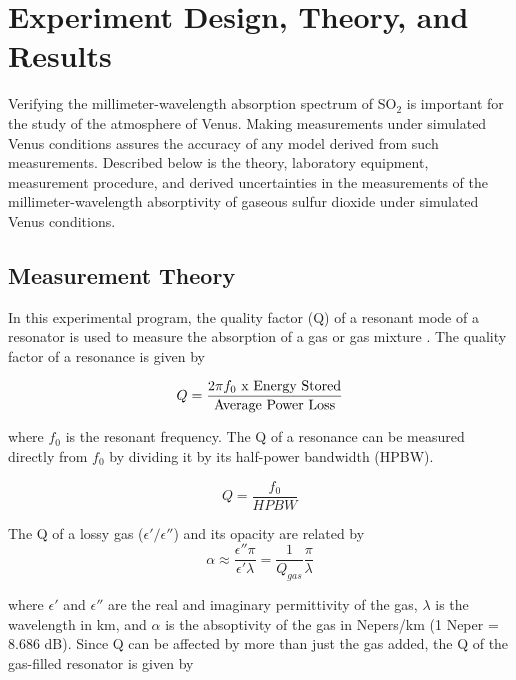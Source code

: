 \chapter{Experiment Design, Theory, and Results}

Verifying the millimeter-wavelength absorption spectrum of SO$_2$ is important for the study of the atmosphere of Venus. Making measurements under simulated Venus conditions assures the accuracy of any model derived from such measurements.
 Described below is the theory, laboratory equipment, measurement procedure, and derived uncertainties in the measurements of the millimeter-wavelength absorptivity of gaseous sulfur dioxide under simulated Venus conditions.

\section{Measurement Theory}

In this experimental program, the quality factor (Q) of a resonant mode of a resonator is used to measure the absorption of a gas or gas mixture \cite{Hanley-2007}. The quality factor of a resonance is given by \cite{Matthael-1980}

\begin{equation} \label{eq:qlong}
Q = \frac{2\pi f_0 \textnormal{ x Energy Stored}}{\textnormal{Average Power Loss}}
\end{equation}

\noindent where $f_0$ is the resonant frequency. The Q of a resonance can be measured directly from $f_0$ by dividing it by its half-power bandwidth (HPBW).

\begin{equation} \label{eq:qshort}
Q = \frac{f_0}{HPBW}
\end{equation}

\noindent The Q of a lossy gas ($\epsilon'/\epsilon''$) and its opacity are related by
\begin{equation} \label{eq:alphaapprox}
\alpha \approx \frac{\epsilon'' \pi}{\epsilon' \lambda} = \frac{1}{Q_{gas}} \frac{\pi}{\lambda}
\end{equation}

\noindent where $\epsilon'$ and $\epsilon''$ are the real and imaginary permittivity of the gas, $\lambda$ is the wavelength in km, and $\alpha$ is the absoptivity of the gas in Nepers/km (1 Neper = 8.686 dB). Since Q can be affected by more than just the gas added, the Q of the gas-filled resonator is given by

